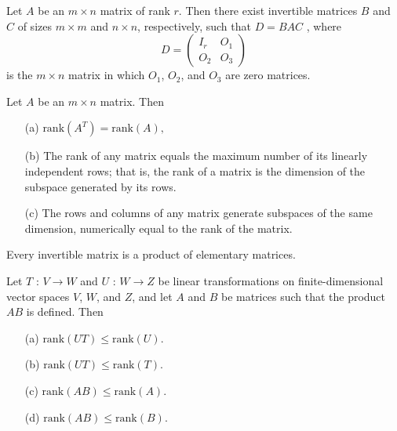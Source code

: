 \begin{corollary}
    Let \( A \) be an \( m \times n \) matrix of rank \( r \). Then there exist invertible matrices \( B \) and \( C \) of sizes \( m \times m \) and \( n \times n \), respectively, such that \( D = BAC \) ,
    where 
    \[
    D  =  \begin{pmatrix}
        I_r & O_1 \\
        O_2 & O_3
    \end{pmatrix}
    \]
    is the \( m \times n \) matrix in which \( O_1 \), \( O_2 \), and \( O_3 \) are zero matrices.
\end{corollary}
\vspace{7cm}

\begin{corollary}
    Let \( A \) be an \( m \times n \) matrix. Then 
    \begin{enumerate}
        \item[(a)] \(\text{rank}(A^T) = \text{rank}(A),\)
        \item[(b)] The rank of any matrix equals the maximum number of its linearly independent rows; that is, the rank of a matrix is the dimension of the subspace generated by its rows.
        \item[(c)] The rows and columns of any matrix generate subspaces of the same dimension, numerically equal to the rank of the matrix.
    \end{enumerate}
\end{corollary}
\vspace{7cm}
\begin{corollary}
    Every invertible matrix is a product of elementary matrices.
\end{corollary}
\vspace{5cm}
\begin{theorem}
    Let \( T \) : \( V \to W \) and \( U \) : \( W \to Z \) be linear transformations on finite-dimensional vector spaces \( V \), \( W \), and \( Z \), and let \( A \) and \( B \) be matrices such that the product \( AB \) is defined. Then
    \begin{enumerate}
        \item[(a)] \(\text{rank}(UT) \leq \text{rank}(U).\)
        \item[(b)] \(\text{rank}(UT) \leq \text{rank}(T).\)
        \item[(c)] \(\text{rank}(AB) \leq \text{rank}(A).\)
        \item[(d)] \(\text{rank}(AB) \leq \text{rank}(B).\)
    \end{enumerate}
\end{theorem}
\newpage

